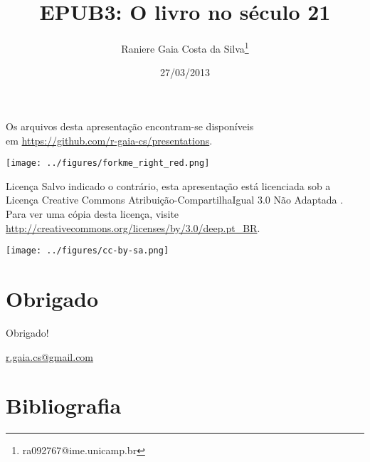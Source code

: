 \documentclass[11pt]{beamer}
\begin{document}
\title[EPUB3]{EPUB3: O livro no século 21}
\author[Raniere Silva]{Raniere Gaia Costa da
Silva\footnote{ra092767@ime.unicamp.br}}
\date{27/03/2013}

\begin{frame}
  \maketitle
\end{frame}

\begin{frame}
  \begin{block}{}
    Os arquivos desta apresentação encontram-se disponíveis \\
    em \url{https://github.com/r-gaia-cs/presentations}. \\
    \vspace{-33pt}
    \begin{flushright}
      \texttt{[image: ../figures/forkme\_right\_red.png]}
    \end{flushright}
  \end{block}

  \begin{block}{Licença}
    Salvo indicado o contrário, esta apresentação está licenciada sob a
    Licença Creative Commons Atribuição-CompartilhaIgual 3.0 Não Adaptada .
    Para ver uma cópia desta licença, visite
    \url{http://creativecommons.org/licenses/by/3.0/deep.pt_BR}.
    \begin{center}
      \texttt{[image: ../figures/cc-by-sa.png]}
    \end{center}
  \end{block}
\end{frame}

\begin{frame}
    \tableofcontents
\end{frame}

\begin{frame}
  
\end{frame}

\section*{Obrigado}
\begin{frame}
  \begin{center}
    Obrigado!
  \end{center}
  \begin{center}
    \url{r.gaia.cs@gmail.com}
  \end{center}
\end{frame}

\section*{Bibliografia}
\begin{frame}
  
  
\end{frame}
\end{document}
